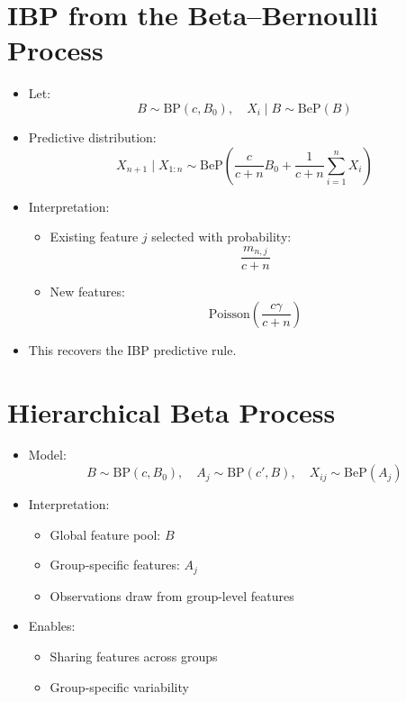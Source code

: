 \documentclass[12pt,oneside]{book}
\numberwithin{equation}{section}
\theoremstyle{definition}
\theoremstyle{plain}
\theoremstyle{remark}
\begin{document}
\section{IBP from the Beta--Bernoulli Process}

\begin{itemize}
\item Let:
\[
B \sim \text{BP}(c, B_0), \quad X_i \mid B \sim \text{BeP}(B)
\]

\item Predictive distribution:
\[
X_{n+1} \mid X_{1:n}
\sim
\text{BeP}\left(
\frac{c}{c+n} B_0 + \frac{1}{c+n}\sum_{i=1}^n X_i
\right)
\]

\item Interpretation:
\begin{itemize}
\item Existing feature $j$ selected with probability:
\[
\frac{m_{n,j}}{c+n}
\]

\item New features:
\[
\text{Poisson}\left(\frac{c\gamma}{c+n}\right)
\]
\end{itemize}

\item This recovers the IBP predictive rule.
\end{itemize}

\section{Hierarchical Beta Process}

\begin{itemize}
\item Model:
\[
B \sim \text{BP}(c, B_0), \quad A_j \sim \text{BP}(c', B), \quad X_{ij} \sim \text{BeP}(A_j)
\]

\item Interpretation:
\begin{itemize}
\item Global feature pool: $B$
\item Group-specific features: $A_j$
\item Observations draw from group-level features
\end{itemize}

\item Enables:
\begin{itemize}
\item Sharing features across groups
\item Group-specific variability
\end{itemize}
\end{itemize}
\end{document}
